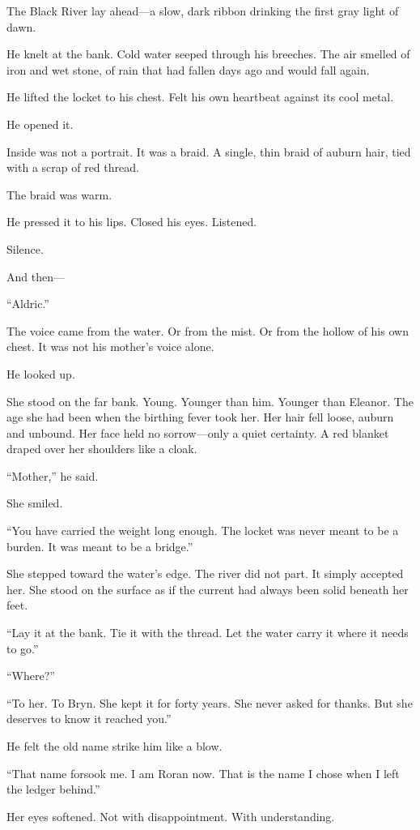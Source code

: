 \documentclass[9pt,a5paper]{extbook}
\begin{document}
The Black River lay ahead---a slow, dark ribbon drinking the first gray light of dawn.

He knelt at the bank. Cold water seeped through his breeches. The air smelled of iron and wet stone, of rain that had fallen days ago and would fall again.

He lifted the locket to his chest. Felt his own heartbeat against its cool metal.

He opened it.

Inside was not a portrait. It was a braid. A single, thin braid of auburn hair, tied with a scrap of red thread.

The braid was warm.

He pressed it to his lips. Closed his eyes. Listened.

Silence.

And then---

``Aldric.''

The voice came from the water. Or from the mist. Or from the hollow of his own chest. It was not his mother's voice alone.

He looked up.

She stood on the far bank. Young. Younger than him. Younger than Eleanor. The age she had been when the birthing fever took her. Her hair fell loose, auburn and unbound. Her face held no sorrow---only a quiet certainty. A red blanket draped over her shoulders like a cloak.

``Mother,'' he said.

She smiled.

``You have carried the weight long enough. The locket was never meant to be a burden. It was meant to be a bridge.''

She stepped toward the water's edge. The river did not part. It simply accepted her. She stood on the surface as if the current had always been solid beneath her feet.

``Lay it at the bank. Tie it with the thread. Let the water carry it where it needs to go.''

``Where?''

``To her. To Bryn. She kept it for forty years. She never asked for thanks. But she deserves to know it reached you.''

He felt the old name strike him like a blow.

``That name forsook me. I am Roran now. That is the name I chose when I left the ledger behind.''

Her eyes softened. Not with disappointment. With understanding.
\end{document}
